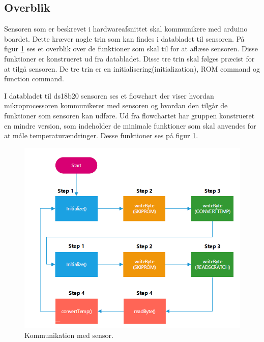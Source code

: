 \newpage

\subsection{Overblik}
Sensoren som er beskrevet i hardwareafsnittet skal kommunikere med arduino boardet. Dette kræver nogle trin som kan findes i databladet til sensoren. På figur \ref{sensor_kom} ses et overblik over de funktioner som skal til for at aflæse sensoren. Disse funktioner er konstrueret ud fra databladet. Disse tre trin skal følges præcist for at tilgå sensoren. De tre trin er en initialisering(initialization), ROM command og function command.

I databladet til ds18b20 sensoren ses et flowchart der viser hvordan mikroprocessoren kommunikerer med sensoren og hvordan den tilgår de funktioner som sensoren kan udføre. Ud fra flowchartet har gruppen konstrueret en mindre version, som indeholder de minimale funktioner som skal anvendes for at måle temperaturændringer. Desse funktioner ses på figur \ref{sensor_kom}.



\begin{figure}[h!]
  \centering
  \includegraphics[width=1\textwidth]{figures/sensor_communication.png}
  \caption{Kommunikation med sensor.}
  \label{sensor_kom}
\end{figure}
\\

